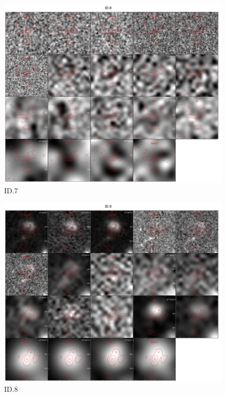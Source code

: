 \begin{figure}[tbp]
\centering \includegraphics[width=120mm]{Matched/ASPECS_Cutout_7.jpg}
\caption{ID.7}
\label{fig:Match_Three}
\end{figure}

\begin{figure}[tbp]
\centering \includegraphics[width=120mm]{Matched/ASPECS_Cutout_8.jpg}
\caption{ID.8}
\label{fig:Match_Three}
\end{figure}

